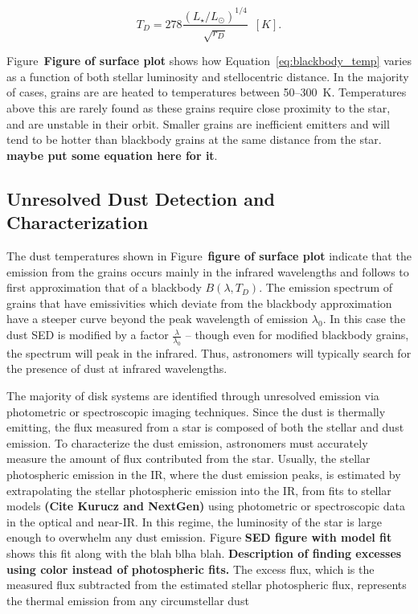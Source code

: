             
            \begin{equation}\label{eq:blackbody_temp}
            T_D = 278 \frac{\left(L_\star/L_\odot \right)^{1/4}}{\sqrt{r_D}}\enspace [K]. 
            \end{equation}
            
        Figure~\textbf{Figure of surface plot} shows how Equation~\ref{eq:blackbody_temp} varies as a function of both stellar luminosity and stellocentric distance. In the majority of cases, grains are are heated to temperatures between 50--300~K. Temperatures above this are rarely found as these grains require close proximity to the star, and are unstable in their orbit. Smaller grains are inefficient emitters and will tend to be hotter than blackbody grains at the same distance from the star. \textbf{maybe put some equation here for it}.
            
           
        \subsection{Unresolved Dust Detection and Characterization}            
            
        The dust temperatures shown in Figure~\textbf{figure of surface plot} indicate that the emission from the grains occurs mainly in the infrared wavelengths and follows to first approximation that of a blackbody $B(\lambda,T_D)$. The emission spectrum of grains that have emissivities which deviate from the blackbody approximation have a steeper curve beyond the peak wavelength of emission $\lambda_0$. In this case the dust SED is modified by a factor $\frac{\lambda}{\lambda_0}$ -- though even for modified blackbody grains, the spectrum will peak in the infrared. Thus, astronomers will typically search for the presence of dust at infrared wavelengths. 
        
        The majority of disk systems are identified through unresolved emission via photometric or spectroscopic imaging techniques. Since the dust is thermally emitting, the flux measured from a star is composed of both the stellar and dust emission. To characterize the dust emission, astronomers must accurately measure the amount of flux contributed from the star. Usually, the stellar photospheric emission in the IR, where the dust emission peaks, is estimated by extrapolating the stellar photospheric emission into the IR, from fits to stellar models \textbf{(Cite Kurucz and NextGen)} using photometric or spectroscopic data in the optical and near-IR. In this regime, the luminosity of the star is large enough to overwhelm any dust emission. Figure \textbf{SED figure with model fit} shows this fit along with the blah blha blah. \textbf{Description of finding excesses using color instead of photospheric fits.} The excess flux, which is the measured flux subtracted from the estimated stellar photospheric flux, represents the thermal emission from any circumstellar dust
        
